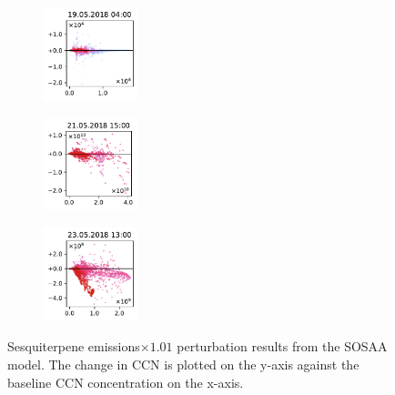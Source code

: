 \begin{figure}[H]
    \begin{subfigure}
        \centering
        \includegraphics[width=0.30\textwidth,valign=t]{evaluation/figures/perturbations/perturbation-19.05.2018:04.00-sesquiterpenes-mul-1.01.pdf}
    \end{subfigure}
    \begin{subfigure}
        \centering
        \includegraphics[width=0.30\textwidth,valign=t]{evaluation/figures/perturbations/perturbation-21.05.2018:15.00-sesquiterpenes-mul-1.01.pdf}
    \end{subfigure}
    \begin{subfigure}
        \centering
        \includegraphics[width=0.30\textwidth,valign=t]{evaluation/figures/perturbations/perturbation-23.05.2018:13.00-sesquiterpenes-mul-1.01.pdf}
    \end{subfigure}
    
    \caption[Sesquiterpene emissions$\times 1.01$ perturbation SOSAA results]{Sesquiterpene emissions$\times 1.01$ perturbation results from the SOSAA model. The change in CCN is plotted on the y-axis against the baseline CCN concentration on the x-axis.}
    \label{fig:sosaa-perturbation-sesquiterpenes-mul-1.01}
\end{figure}

